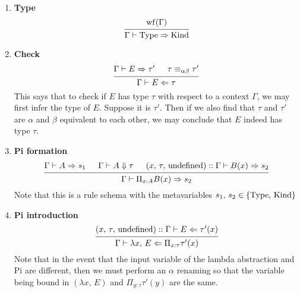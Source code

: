 \documentclass{article}
\begin{document}
\begin{definition} 
\begin{enumerate}
  \item \textbf{Type} \\
    \[
      \begin{prooftree}
        \hypo{\wf(\Gamma)}
        \infer1{\Gamma \vdash \Type \Rightarrow \Kind}
      \end{prooftree}
    \]


  \item \textbf{Check} \\
    \[
      \begin{prooftree}
        \hypo{\Gamma \vdash E \Rightarrow \tau'}
        \hypo{\tau \equiv_{\alpha \beta} \tau'}
        \infer2{\Gamma \vdash E \Leftarrow \tau}
      \end{prooftree}
    \]
    This says that to check if $E$ has type $\tau$ with respect to a context
    $\Gamma$, we may first infer the type of $E$. Suppose it is $\tau'$. Then
    if we also find that $\tau$ and $\tau'$ are $\alpha$ and $\beta$ equivalent
    to each other, we may conclude that $E$ indeed has type $\tau$.

  \item \textbf{Pi formation} \\
    \[
      \begin{prooftree}
        \hypo{\Gamma \vdash A \Rightarrow s_1}
        \hypo{\Gamma \vdash A \Downarrow \tau}
        \hypo{(x, \, \tau, \, \text{undefined}) :: \Gamma \vdash B(x) \Rightarrow s_2}
        \infer3{\Gamma \vdash \Pi_{x : A}B(x) \Rightarrow s_2}
      \end{prooftree}
    \]
    Note that this is a rule schema with the metavariables 
    $s_1, \, s_2 \in \{\operatorname{Type}, \, \operatorname{Kind}\}$


  \item \textbf{Pi introduction} \\
    \[
      \begin{prooftree}
        \hypo{(x, \, \tau, \, \text{undefined}) :: \Gamma \vdash E \Leftarrow \tau'(x)}
        \infer1{\Gamma \vdash \lambda x, \, E \Leftarrow \Pi_{x : \tau}\tau'(x)}
      \end{prooftree}
    \]
    Note that in the event that the input variable of the lambda abstraction and
    Pi are different, then we must perform an $\alpha$ renaming so that the
    variable being bound in $(\lambda x, \, E)$ and $\Pi_{y : \tau} \tau'(y)$
    are the same.


\end{enumerate}
\end{definition}
\end{document}
